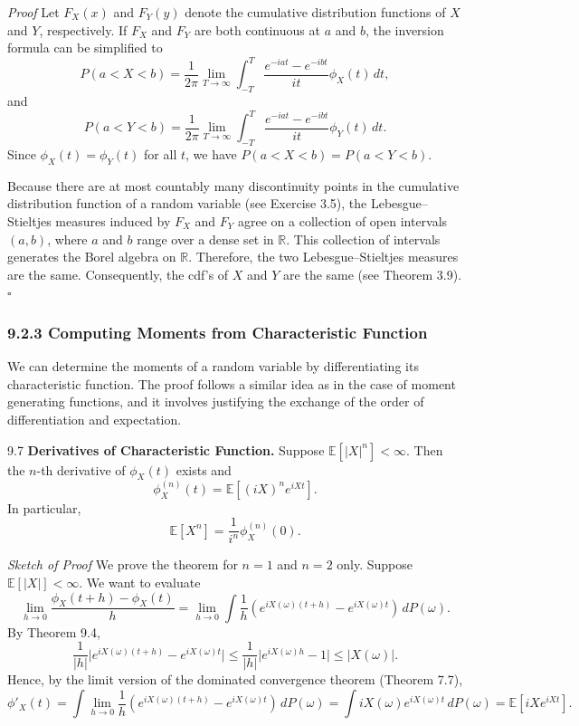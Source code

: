 \textit{Proof}
Let $F_X(x)$ and $F_Y(y)$ denote the cumulative distribution functions of $X$ and $Y$, respectively. If $F_X$ and $F_Y$ are both continuous at $a$ and $b$, the inversion formula can be simplified to
\[
P(a<X<b)
=\frac{1}{2\pi}\lim_{T\to\infty}\int_{-T}^{T}
\frac{e^{-iat}-e^{-ibt}}{it}\phi_X(t)\,dt,
\]
and
\[
P(a<Y<b)
=\frac{1}{2\pi}\lim_{T\to\infty}\int_{-T}^{T}
\frac{e^{-iat}-e^{-ibt}}{it}\phi_Y(t)\,dt.
\]
Since $\phi_X(t)=\phi_Y(t)$ for all $t$, we have $P(a<X<b)=P(a<Y<b)$.

Because there are at most countably many discontinuity points in the cumulative distribution function of a random variable (see Exercise 3.5), the Lebesgue--Stieltjes measures induced by $F_X$ and $F_Y$ agree on a collection of open intervals $(a,b)$, where $a$ and $b$ range over a dense set in $\mathbb{R}$. This collection of intervals generates the Borel algebra on $\mathbb{R}$. Therefore, the two Lebesgue--Stieltjes measures are the same. Consequently, the cdf's of $X$ and $Y$ are the same (see Theorem 3.9).
\hfill $\square$

\subsubsection*{9.2.3 Computing Moments from Characteristic Function}

We can determine the moments of a random variable by differentiating its characteristic function. The proof follows a similar idea as in the case of moment generating functions, and it involves justifying the exchange of the order of differentiation and expectation.

\begin{thmbox}{9.7}
\textbf{Derivatives of Characteristic Function.}
Suppose $\mathbb{E}[\lvert X\rvert^n]<\infty$. Then the $n$-th derivative of $\phi_X(t)$ exists and
\[
\phi_X^{(n)}(t)=\mathbb{E}[(iX)^n e^{iXt}].
\]
In particular,
\[
\mathbb{E}[X^n]=\frac{1}{i^n}\phi_X^{(n)}(0).
\]
\end{thmbox}

\textit{Sketch of Proof}
We prove the theorem for $n=1$ and $n=2$ only. Suppose $\mathbb{E}[\lvert X\rvert]<\infty$. We want to evaluate
\[
\lim_{h\to 0}\frac{\phi_X(t+h)-\phi_X(t)}{h}
=\lim_{h\to 0}\int \frac{1}{h}
\left(e^{iX(\omega)(t+h)}-e^{iX(\omega)t}\right)\,dP(\omega).
\]
By Theorem 9.4,
\[
\frac{1}{\lvert h\rvert}
\lvert e^{iX(\omega)(t+h)}-e^{iX(\omega)t}\rvert
\leq
\frac{1}{\lvert h\rvert}\lvert e^{iX(\omega)h}-1\rvert
\leq \lvert X(\omega)\rvert.
\]
Hence, by the limit version of the dominated convergence theorem (Theorem 7.7),
\[
\phi'_X(t)
=\int \lim_{h\to 0}\frac{1}{h}
\left(e^{iX(\omega)(t+h)}-e^{iX(\omega)t}\right)\,dP(\omega)
=\int iX(\omega)e^{iX(\omega)t}\,dP(\omega)
=\mathbb{E}[iXe^{iXt}].
\]

